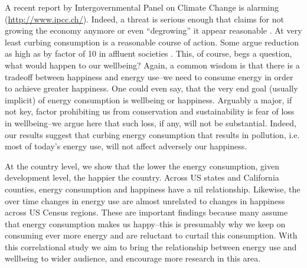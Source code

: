 \documentclass[10pt, letterpaper]{article}
\begin{document}
\begin{spacing}{1.4}
A recent report by
Intergovernmental Panel on Climate Change is alarming 
(\url{http://www.ipcc.ch/}). %
Indeed, a threat is serious enough that
claims for not growing the economy anymore or even ``degrowing'' it
appear reasonable \cite{kallis11, kallis12}. %
At very
least curbing consumption is a reasonable course of action. Some argue reduction as high
as by factor of 10 in affluent societies \cite{pretty13}. This,
of course, begs a question, what would happen to our wellbeing?
 Again, a common %
wisdom is that there is a tradeoff between happiness and
energy use--we need to consume energy in order to achieve greater
happiness. One could even say, that the very end goal (usually implicit)
of energy consumption is wellbeing or happiness.  %
%
Arguably a major, if not key, factor prohibiting us from conservation and
sustainability is fear of loss in wellbeing--we argue here that such loss, if
any,  will
not be substantial. Indeed, our results suggest that curbing energy consumption that results
in pollution, i.e. most of today's energy use, will not affect adversely our
happiness.  %

At the country level, we show that the lower the energy consumption, given development
level, the happier the country.  Across US states and California counties,
energy consumption and happiness have a nil relationship. 
Likewise, the over time changes in energy use are almost unrelated to changes in
 happiness across US Census regions. 
These are important findings  because many assume that energy consumption makes us
happy--this is presumably why we keep on consuming ever more energy and are
reluctant to curtail this consumption. %
With this correlational study we aim to bring the relationship between energy
use and wellbeing to wider audience, and encourage more research in this area. 




\end{spacing}
\end{document}
